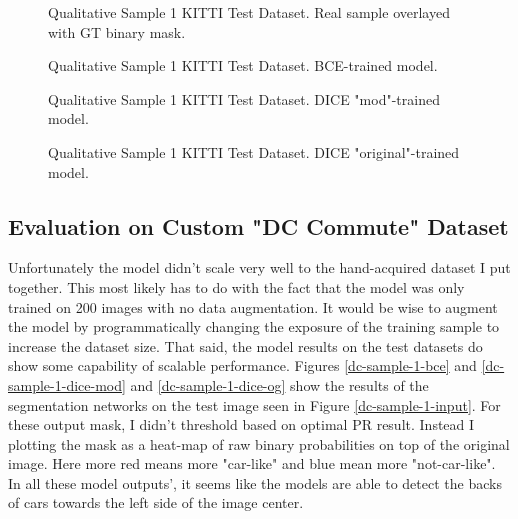 \documentclass[Location Location Location! : Exploring Image Segmentation Problem In Urban Driving Scenarios]{IEEEtran}
\begin{document}
\begin{figure}[htbp]
\caption{Qualitative Sample 1 KITTI Test Dataset. Real sample overlayed with GT binary mask.}
\label{kitti-sample-1-gt}
\end{figure}


\begin{figure}[htbp]
\caption{Qualitative Sample 1 KITTI Test Dataset. BCE-trained model.}
\label{kitti-sample-1-bce}
\end{figure}



\begin{figure}[htbp]
\caption{Qualitative Sample 1 KITTI Test Dataset. DICE "mod"-trained model.}
\label{kitti-sample-1-dice-mod}
\end{figure}



\begin{figure}[htbp]
\caption{Qualitative Sample 1 KITTI Test Dataset. DICE "original"-trained model.}
\label{kitti-sample-1-dice-og}
\end{figure}




\subsection{Evaluation on Custom "DC Commute" Dataset}


Unfortunately the model didn't scale very well to the hand-acquired dataset I put together. This most likely has to do with the fact that the model was only trained on 200 images with no data augmentation. It would be wise to augment the model by programmatically changing the exposure of the training sample to increase the dataset size. That said, the model results on the test datasets do show some capability of scalable performance. Figures \ref{dc-sample-1-bce} and \ref{dc-sample-1-dice-mod} and \ref{dc-sample-1-dice-og} show the results of the segmentation networks on the test image seen in Figure \ref{dc-sample-1-input}. For these output mask, I didn't threshold based on optimal PR result. Instead I plotting the mask as a heat-map of raw binary probabilities on top of the original image. Here more red means more "car-like" and blue mean more "not-car-like". In all these model outputs', it seems like the models are able to detect the backs of cars towards the left side of the image center. 
\end{document}
